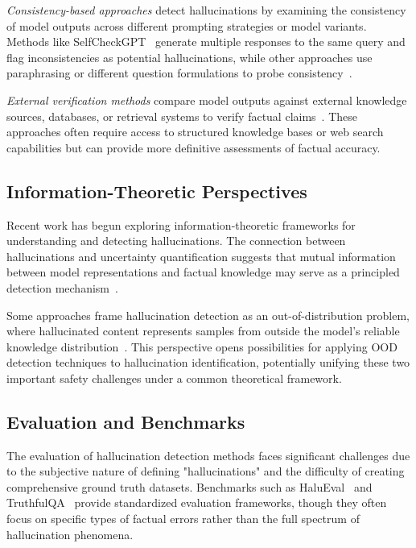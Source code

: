 \documentclass[11pt, oneside]{book}
\theoremstyle{plain}
\theoremstyle{definition}
\theoremstyle{remark}
\begin{document}
\emph{Consistency-based approaches} detect hallucinations by examining the consistency of model outputs across different prompting strategies or model variants. Methods like SelfCheckGPT~\citep{manakul2023selfcheckgpt} generate multiple responses to the same query and flag inconsistencies as potential hallucinations, while other approaches use paraphrasing or different question formulations to probe consistency~\citep{li2023halueval}.

\emph{External verification methods} compare model outputs against external knowledge sources, databases, or retrieval systems to verify factual claims~\citep{peng2023check,chern2023factool}. These approaches often require access to structured knowledge bases or web search capabilities but can provide more definitive assessments of factual accuracy.

\subsection{Information-Theoretic Perspectives}

Recent work has begun exploring information-theoretic frameworks for understanding and detecting hallucinations. The connection between hallucinations and uncertainty quantification suggests that mutual information between model representations and factual knowledge may serve as a principled detection mechanism~\citep{farquhar2024detecting}.

Some approaches frame hallucination detection as an out-of-distribution problem, where hallucinated content represents samples from outside the model's reliable knowledge distribution~\citep{burns2023discovering}. This perspective opens possibilities for applying OOD detection techniques to hallucination identification, potentially unifying these two important safety challenges under a common theoretical framework.

\subsection{Evaluation and Benchmarks}

The evaluation of hallucination detection methods faces significant challenges due to the subjective nature of defining "hallucinations" and the difficulty of creating comprehensive ground truth datasets. Benchmarks such as HaluEval~\citep{li2023halueval} and TruthfulQA~\citep{lin2022truthfulqa} provide standardized evaluation frameworks, though they often focus on specific types of factual errors rather than the full spectrum of hallucination phenomena.
\end{document}
